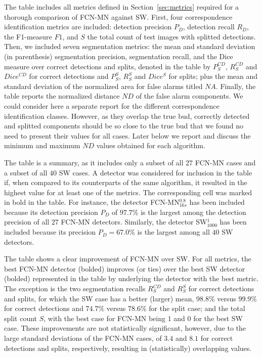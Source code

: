 \documentclass[a4paper,authoryear,review]{elsarticle}
\begin{document}
The table includes all metrics defined in Section~\ref{sec:metrics} required for a thorough comparison of FCN-MN against SW. First, four correspondence identification metrics are included: detection precision $P_D$, detection recall $R_D$, the F1-measure  $F1$, and $S$ the total count of test images with splitted detections. Then, we included seven segmentation metrics: the mean and standard deviation (in parenthesis) segmentation precision, segmentation recall, and the Dice measure over correct detections and splits, denoted in the table by $P_S^{CD}$, $R_S^{CD}$ and $Dice^{CD}$ for correct detections and $P_S^S$, $R_S^S$ and $Dice^S$ for splits; plus the mean and standard deviation of the normalized area for false alarms titled  $NA$. 
%
Finally, the table reports the normalized distance $ND$ of the false alarm components. We could consider here a separate report for the different correspondence identification classes. However, as they overlap the true bud, correctly detected and splitted components should be so close to the true bud that we found no need to present their values for all cases. Later below we report and discuss the minimum and maximum $ND$ values obtained for each algorithm. 

The table is a summary, as it includes only a subset of all $27$ FCN-MN cases and a subset of all $40$ SW cases. A detector was considered for inclusion in the table if, when compared to its counterparts of the same algorithm, it resulted in the highest value for at least one of the metrics. The corresponding cell was marked in bold in the table. For instance, the detector FCN-MN$_{16s}^{0.8}$ has been included because its detection precision $P_D$ of $97.7\%$ is the largest among the detection precision of all $27$ FCN-MN detectors. Similarly, the detector SW$_{1000}^1$ has been included because its precision $P_D = 67.0\%$ is the largest among all $40$ SW detectors. 

The table shows a clear improvement of FCN-MN over SW. For all metrics, the best  FCN-MN detector (bolded) improves (or ties) over the best SW detector (bolded) represented in the table by underlying the detector with the best metric. The exception is the two segmentation recalls $R_S^{CD}$ and $R_S^{S}$ for correct detections and splits, for which the SW case has a better (larger) mean, $98.8\%$ versus $99.9\%$ for correct detections and $74.7\%$ versus $78.6\%$ for the split case; and the total split count $S$, with the best case for FCN-MN being $1$ and $0$ for the best SW case. These improvements are not statistically significant, however, due to the large standard deviations of the FCN-MN cases, of $3.4$ and $8.1$ for correct detections and splits, respectively,  resulting in (statistically) overlapping values. 
\end{document}
